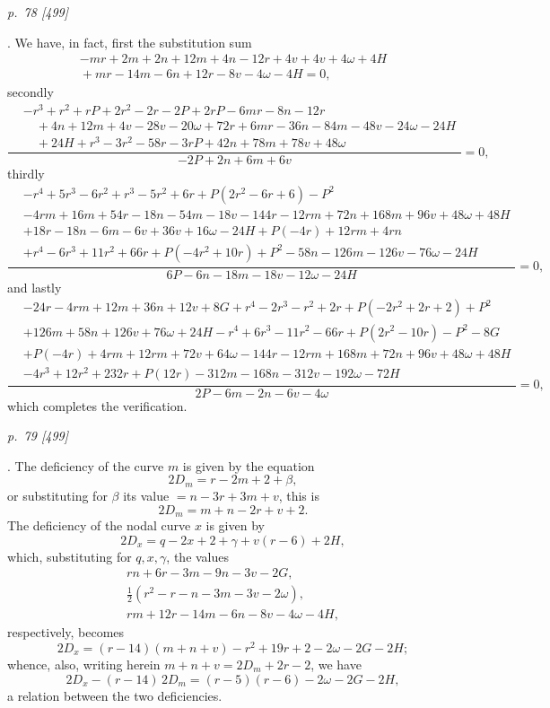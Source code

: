 \documentclass[11pt,a4paper]{article}
\newcommand{\pagemarker}[2]{\clearpage\noindent\textit{p.~#1 [#2]}\par\medskip}
\newcommand{\half}{\tfrac{1}{2}}
\begin{document}
\pagemarker{78}{499}
11. We have, in fact, first the substitution sum
\[
\begin{gathered}
-mr+2m+2n+12m+4n-12r+4v+4v+4\omega+4H\\
{}+mr-14m-6n+12r-8v-4\omega-4H=0,
\end{gathered}
\]
secondly
\begingroup\scriptsize
\[
\frac{
\begin{aligned}
&-r^3+r^2+rP+2r^2-2r-2P+2rP-6mr-8n-12r\\
&\quad+4n+12m+4v-28v-20\omega+72r+6mr-36n-84m-48v-24\omega-24H\\
&\quad+24H+r^3-3r^2-58r-3rP+42n+78m+78v+48\omega
\end{aligned}}
{-2P+2n+6m+6v}=0,
\]
\endgroup
thirdly
\begingroup\scriptsize
\[
\frac{
\begin{aligned}
&-r^4+5r^3-6r^2+r^3-5r^2+6r+P(2r^2-6r+6)-P^2\\
&-4rm+16m+54r-18n-54m-18v-144r-12rm+72n+168m+96v+48\omega+48H\\
&+18r-18n-6m-6v+36v+16\omega-24H+P(-4r)+12rm+4rn\\
&+r^4-6r^3+11r^2+66r+P(-4r^2+10r)+P^2-58n-126m-126v-76\omega-24H
\end{aligned}}
{6P-6n-18m-18v-12\omega-24H}=0,
\]
\endgroup
and lastly
\begingroup\scriptsize
\[
\frac{
\begin{aligned}
&-24r-4rm+12m+36n+12v+8G+r^4-2r^3-r^2+2r+P(-2r^2+2r+2)+P^2\\
&+126m+58n+126v+76\omega+24H-r^4+6r^3-11r^2-66r+P(2r^2-10r)-P^2-8G\\
&+P(-4r)+4rm+12rm+72v+64\omega-144r-12rm+168m+72n+96v+48\omega+48H\\
&-4r^3+12r^2+232r+P(12r)-312m-168n-312v-192\omega-72H
\end{aligned}}
{2P-6m-2n-6v-4\omega}=0,
\]
\endgroup
which completes the verification.

\pagemarker{79}{499}
12. The deficiency of the curve \(m\) is given by the equation
\[
  2D_m=r-2m+2+\beta,
\]
or substituting for \(\beta\) its value \(=n-3r+3m+v\), this is
\[
  2D_m=m+n-2r+v+2.
\]
The deficiency of the nodal curve \(x\) is given by
\[
  2D_x=q-2x+2+\gamma+v(r-6)+2H,
\]
which, substituting for \(q,x,\gamma\), the values
\[
\begin{gathered}
rn+6r-3m-9n-3v-2G,\\
\half(r^2-r-n-3m-3v-2\omega),\\
rm+12r-14m-6n-8v-4\omega-4H,
\end{gathered}
\]
respectively, becomes
\[
  2D_x=(r-14)(m+n+v)-r^2+19r+2-2\omega-2G-2H;
\]
whence, also, writing herein \(m+n+v=2D_m+2r-2\), we have
\[
  2D_x-(r-14)\,2D_m=(r-5)(r-6)-2\omega-2G-2H,
\]
a relation between the two deficiencies.
\end{document}
